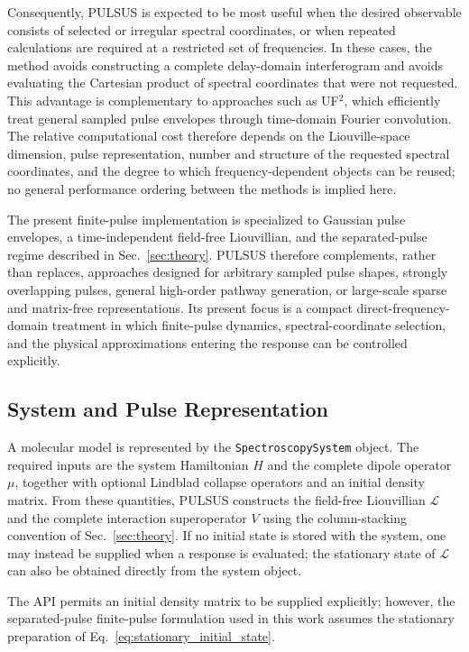 Consequently, PULSUS is expected to be most useful when the desired
observable consists of selected or irregular spectral coordinates, or
when repeated calculations are required at a restricted set of
frequencies. In these cases, the method avoids constructing a complete
delay-domain interferogram and avoids evaluating the Cartesian product
of spectral coordinates that were not requested. This advantage is
complementary to approaches such as UF$^2$, which efficiently treat
general sampled pulse envelopes through time-domain Fourier
convolution. The relative computational cost therefore depends on the
Liouville-space dimension, pulse representation, number and structure
of the requested spectral coordinates, and the degree to which
frequency-dependent objects can be reused; no general performance
ordering between the methods is implied here.

The present finite-pulse implementation is specialized to Gaussian
pulse envelopes, a time-independent field-free Liouvillian, and the
separated-pulse regime described in Sec.~\ref{sec:theory}. PULSUS
therefore complements, rather than replaces, approaches designed for
arbitrary sampled pulse shapes, strongly overlapping pulses, general
high-order pathway generation, or large-scale sparse and matrix-free
representations. Its present focus is a compact direct-frequency-domain
treatment in which finite-pulse dynamics, spectral-coordinate
selection, and the physical approximations entering the response can
be controlled explicitly.

\subsection{System and Pulse Representation}
\label{sec:software_system}

A molecular model is represented by the \texttt{SpectroscopySystem}
object.
The required inputs are the system Hamiltonian $H$ and the complete
dipole operator $\mu$, together with optional Lindblad collapse
operators and an initial density matrix.
From these quantities, PULSUS constructs the field-free Liouvillian
$\mathcal{L}$ and the complete interaction superoperator $V$ using the
column-stacking convention of Sec.~\ref{sec:theory}.
If no initial state is stored with the system, one may instead be
supplied when a response is evaluated; the stationary state of
$\mathcal{L}$ can also be obtained directly from the system object.

The API permits an initial density matrix to be supplied explicitly;
however, the separated-pulse finite-pulse formulation used in this work
assumes the stationary preparation of
Eq.~\eqref{eq:stationary_initial_state}.

